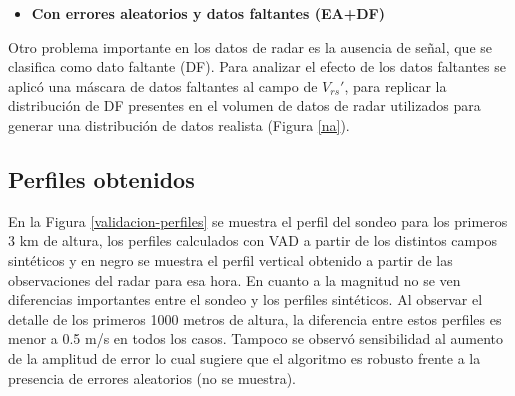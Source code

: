 \documentclass[12pt,spanish,oneside, a4paper]{book}
\providecommand{\tightlist}{%
  \setlength{\itemsep}{0pt}\setlength{\parskip}{0pt}}
\begin{document}
\begin{itemize}
\tightlist
\item
  \textbf{Con errores aleatorios y datos faltantes (EA+DF)}
\end{itemize}

Otro problema importante en los datos de radar es la ausencia de señal,
que se clasifica como dato faltante (DF). Para analizar el efecto de los
datos faltantes se aplicó una máscara de datos faltantes al campo de
\(V_{rs}'\), para replicar la distribución de DF presentes en el volumen
de datos de radar utilizados para generar una distribución de datos
realista (Figura \ref{na}).

\subsection{Perfiles obtenidos}\label{perfiles-obtenidos}

En la Figura \ref{validacion-perfiles} se muestra el perfil del sondeo
para los primeros 3 km de altura, los perfiles calculados con VAD a
partir de los distintos campos sintéticos y en negro se muestra el
perfil vertical obtenido a partir de las observaciones del radar para
esa hora. En cuanto a la magnitud no se ven diferencias importantes
entre el sondeo y los perfiles sintéticos. Al observar el detalle de los
primeros 1000 metros de altura, la diferencia entre estos perfiles es
menor a 0.5 m/s en todos los casos. Tampoco se observó sensibilidad al
aumento de la amplitud de error lo cual sugiere que el algoritmo es
robusto frente a la presencia de errores aleatorios (no se muestra).
\end{document}
